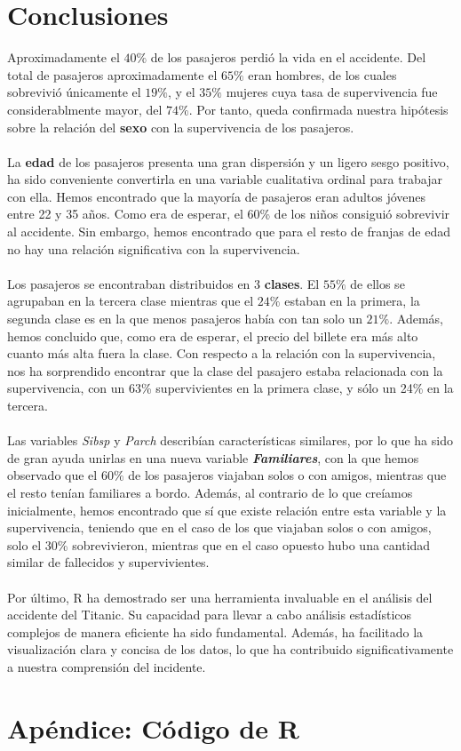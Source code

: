 \documentclass{article}
\begin{document}
\section{Conclusiones}
Aproximadamente el $40\%$ de los pasajeros perdió la vida en el accidente. Del total de pasajeros aproximadamente el $65\%$ eran hombres, de los cuales sobrevivió únicamente el $19\%$, y el $35\%$ mujeres cuya tasa de supervivencia fue considerablmente mayor, del $74\%$. Por tanto, queda confirmada nuestra hipótesis sobre la relación del \textbf{sexo} con la supervivencia de los pasajeros.\\\\
La \textbf{edad} de los pasajeros presenta una gran dispersión y un ligero sesgo positivo, ha sido conveniente convertirla en una variable cualitativa ordinal para trabajar con ella. Hemos encontrado que la mayoría de pasajeros eran adultos jóvenes entre 22 y 35 años. Como era de esperar, el 60\% de los niños consiguió sobrevivir al accidente. Sin embargo, hemos encontrado que para el resto de franjas de edad no hay una relación significativa con la supervivencia.\\\\
Los pasajeros se encontraban distribuidos en $3$ \textbf{clases}. El $55\%$ de ellos se agrupaban en la tercera clase mientras que el $24\%$ estaban en la primera, la segunda clase es en la que menos pasajeros había con tan solo un $21\%$. Además, hemos concluido que, como era de esperar, el precio del billete era más alto cuanto más alta fuera la clase. Con respecto a la relación con la supervivencia, nos ha sorprendido encontrar que la clase del pasajero estaba relacionada con la supervivencia, con un 63\% supervivientes en la primera clase, y sólo un 24\% en la tercera.\\\\
Las variables \textit{Sibsp} y \textit{Parch} describían características similares, por lo que ha sido de gran ayuda unirlas en una nueva variable \textit{\textbf{Familiares}}, con la que hemos observado que el $60\%$ de los pasajeros viajaban solos o con amigos, mientras que el resto tenían familiares a bordo. Además, al contrario de lo que creíamos inicialmente, hemos encontrado que sí que existe relación entre esta variable y la supervivencia, teniendo que en el caso de los que viajaban solos o con amigos, solo el 30\% sobrevivieron, mientras que en el caso opuesto hubo una cantidad similar de fallecidos y supervivientes.\\\\
Por último, R ha demostrado ser una herramienta invaluable en el análisis del accidente del Titanic. Su capacidad para llevar a cabo análisis estadísticos complejos de manera eficiente ha sido fundamental. Además, ha facilitado la visualización clara y concisa de los datos, lo que ha contribuido significativamente a nuestra comprensión del incidente.

\newpage
\appendix
\section{Apéndice: Código de R}


\end{document}
